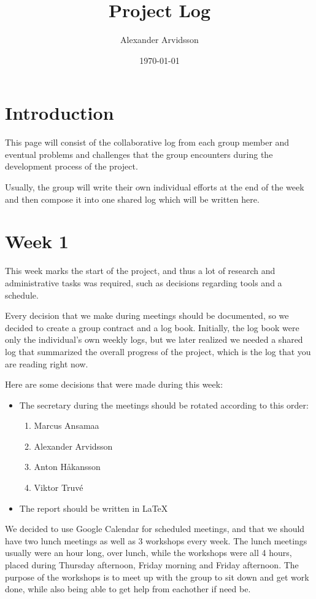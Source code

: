 \documentclass[11pt]{article}
\author{Alexander Arvidsson}
\date{\today}
\title{Project Log}
\begin{document}
\maketitle
\tableofcontents

\setlength{\parindent}{0pt}
\setlength{\parskip}{\baselineskip}

\section*{Introduction}
\label{sec:org402d66a}
This page will consist of the collaborative log from each group member and
eventual problems and challenges that the group encounters during the
development process of the project.

Usually, the group will write their own individual efforts at the end of the
week and then compose it into one shared log which will be written here.

\section*{Week 1}
\label{sec:org9b5f427}
This week marks the start of the project, and thus a lot of research and
administrative tasks was required, such as decisions regarding tools and
a schedule.

Every decision that we make during meetings should be documented, so we decided
to create a group contract and a log book. Initially, the log book were only the
individual's own weekly logs, but we later realized we needed a shared log that
summarized the overall progress of the project, which is the log that you are
reading right now.

Here are some decisions that were made during this week:
\begin{itemize}
\item The secretary during the meetings should be rotated according to this order:
\begin{enumerate}
\item Marcus Ansamaa
\item Alexander Arvidsson
\item Anton Håkansson
\item Viktor Truvé
\end{enumerate}
\item The report should be written in  \LaTeX{}
\end{itemize}


We decided to use Google Calendar for scheduled meetings, and that we should
have two lunch meetings as well as 3 workshops every week. The lunch meetings
usually were an hour long, over lunch, while the workshops were all 4 hours,
placed during Thursday afternoon, Friday morning and Friday afternoon.
The purpose of the workshops is to meet up with the group to sit down and get
work done, while also being able to get help from eachother if need be.
\end{document}
